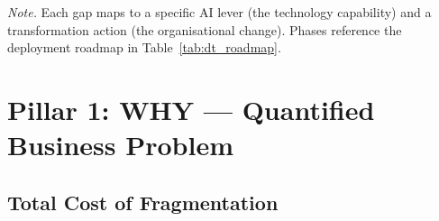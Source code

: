 \vspace{0.5em}\noindent\textit{Note.} Each gap maps to a specific AI lever (the technology capability) and a transformation action (the organisational change). Phases reference the deployment roadmap in Table~\ref{tab:dt_roadmap}.


\section{Pillar 1: WHY --- Quantified Business Problem}
\label{sec:dt_why}

\subsection{Total Cost of Fragmentation}
\label{sec:dt_cost_fragmentation}


